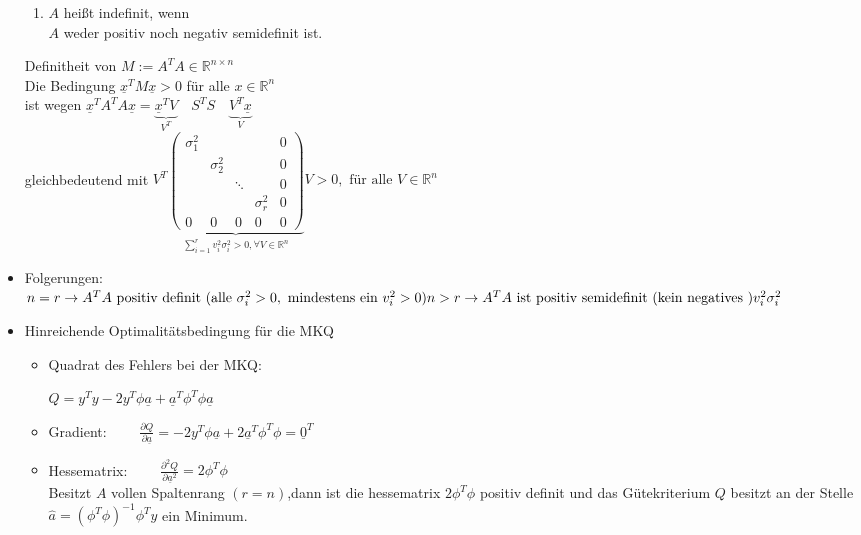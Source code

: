 \documentclass[ngerman]{tudscrreprt}
\begin{document}
\begin{itemize}
\begin{enumerate}
\item $A$ heißt indefinit, wenn\\
	$A$ weder positiv noch negativ semidefinit ist.
\end{enumerate}

Definitheit von $M:= A^T A \in \mathbb{R}^{n\times n}$\\

Die Bedingung $\underline{x}^T M \underline{x} > 0$ für alle $x \in \mathbb{R}^n$\\ ist wegen $ \underline{x}^T A^T A \underline{x} = \underbrace{\underline{x}^T V}_{V^T} \quad S^T S \quad \underbrace{V^T \underline{x}}_{V}$ \\

gleichbedeutend mit 
$V^T 
\underbrace{
\begin{pmatrix}
\sigma_1^2 &            &          &          & 0 \\
           &\sigma_2^2  &          &          & 0 \\
           &            & \ddots   &          & 0 \\
           &            &          &\sigma_r^2& 0 \\
          0& 0          & 0        &0         & 0  
\end{pmatrix}
}_{\sum\limits_{i=1}^r v_i^2 \sigma_i^2 > 0, \forall V \in \mathbb{R}^n }
V > 0 , \text{ für alle  }V \in \mathbb{R}^n$\\
\item Folgerungen:\\
$n= r \rightarrow A^T A \text{  positiv definit (alle } \sigma_i^2 > 0, \text{ mindestens ein } v_i^2 > 0 ) \\
n>r \rightarrow A^T A \text{  ist positiv semidefinit (kein negatives )} v_i^2 \sigma_i^2$\\

\item Hinreichende Optimalitätsbedingung für die MKQ
\begin{itemize}
\item Quadrat des Fehlers bei der MKQ: 

$Q= y^T y - 2 y^T \phi \underline{a} + \underline{a}^T \phi^T \phi \underline{a}$\\
\item Gradient:
$\qquad \frac{\partial{Q}}{\partial{\underline{a}}} = -2 y^T \phi \underline{a} + 2 \underline{a}^T \phi^T \phi = \underline{0}^T$\\
\item Hessematrix:
$\qquad \frac{\partial^2 Q }{\partial{\underline{a}^2}} = 2 \phi^T \phi$\\
Besitzt $A$ vollen Spaltenrang $(r=n)$,dann ist die hessematrix $2\phi^T \phi$ positiv definit und das Gütekriterium $Q$ besitzt an der Stelle $\hat{a}= (\phi^T \phi)^{-1} \phi^T y$ ein Minimum.
\end{itemize}
\end{itemize}
\end{document}
